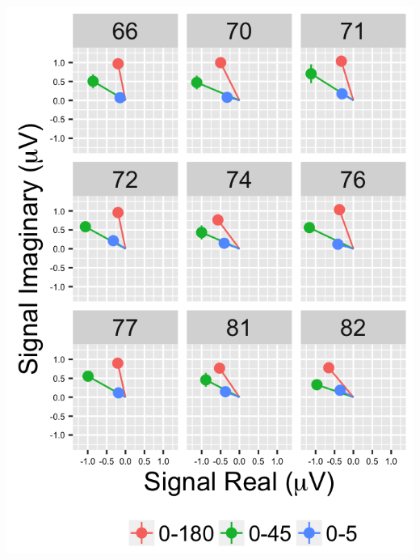 \documentclass[landscape,final,paperwidth=72in,paperheight=40.5in,fontscale=0.285]{baposter}
\begin{document}
\begin{poster}
{\begin{center}
  \includegraphics[scale=0.18,valign=t]{../../figs/2F1-plot-vector-avg-1.png}
  
\end{center}

}
{

}
\end{poster}
\end{document}
